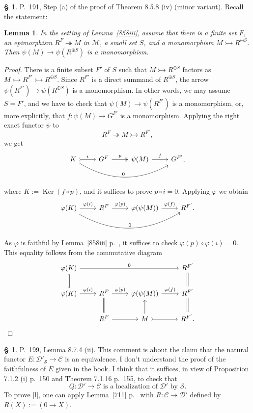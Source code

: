 \documentclass[12pt]{article}%
\newtheorem{lem}[thm]{Lemma}
\theoremstyle{remark}
\theoremstyle{definition}
\newtheorem{s}[thm]{\S}%
\newcommand{\cc}{\mathcal}
\newcommand{\C}{\mathcal C}
\newcommand{\M}{\mathcal M}
\newcommand{\epi}{\twoheadrightarrow}
\DeclareMathOperator{\Ker}{Ker}
\begin{document}
\begin{s} 
P.~191, Step (a) of the proof of Theorem 8.5.8 (iv) (minor variant). Recall the statement: 

\begin{lem}
In the setting of Lemma~\ref{858iii}, assume that there is a finite set $F$, an epimorphism $R^F\epi M$ in $\M$, a small set $S$, and a monomorphism $M\rightarrowtail R^{\oplus S}$. Then $\psi(M)\to\psi(R^{\oplus S})$ is a monomorphism. 
\end{lem}

\begin{proof}
There is a finite subset $F'$ of $S$ such that $M\rightarrowtail R^{\oplus S}$ factors as $M\rightarrowtail R^{F'}\rightarrowtail R^{\oplus S}$. Since $R^{F'}$ is a direct summand of $R^{\oplus S}$, the arrow $\psi(R^{F'})\to\psi(R^{\oplus S})$ is a monomorphism. In other words, we may assume $S=F'$, and we have to check that $\psi(M)\to\psi(R^{F'})$ is a monomorphism, or, more explicitly, that $f:\psi(M)\to G^{F'}$ is a monomorphism. Applying the right exact functor $\psi$ to 
$$
R^F\epi M\rightarrowtail R^{F'},
$$
we get 
$$
\begin{tikzcd}
K\ar[tail]{r}{i}\ar[bend right]{rrr}{0}&G^F\ar[two heads]{r}{p}&\psi(M)\ar{r}{f}&G^{F'},
\end{tikzcd}
$$
where $K:=\Ker(f\circ p)$, and it suffices to prove $p\circ i=0$. Applying $\varphi$ we obtain
$$
\begin{tikzcd}
\varphi(K)\ar{r}{\varphi(i)}\ar[bend right]{rrr}{0}&R^F\ar{r}{\varphi(p)}&\varphi(\psi(M))\ar{r}{\varphi(f)}&R^{F'}.
\end{tikzcd}
$$
As $\varphi$ is faithful by Lemma~\ref{858iii} p.~\pageref{858iii}, it suffices to check $\varphi(p)\circ\varphi(i)=0$. This equality follows from the commutative diagram
$$
\begin{tikzcd}
\varphi(K)\ar[equal]{d}\ar{rrr}{0}&&&R^{F'}\ar[equal]{d}\\
\varphi(K)\ar{r}{\varphi(i)}&R^F\ar[equal]{d}\ar{r}{\varphi(p)}&\varphi(\psi(M))\ar{r}{\varphi(f)}&R^{F'}\ar[equal]{d}\\
&R^F\ar{r}&M\ar[tail]{r}\ar{u}&R^{F'}.
\end{tikzcd}
$$
\end{proof}
\end{s}
%
%
\begin{s}
P.~199, Lemma 8.7.4 (ii). This comment is about the claim that the natural functor $E:\cc D'_{\cc S}\to\C$ is an equivalence. I don't understand the proof of the faithfulness of $E$ given in the book. I think that it suffices, in view of Proposition 7.1.2 (i) p.~150 and Theorem 7.1.16 p.~155, to check that
%
\begin{equation}\label{l}
Q:\cc D'\to\C\text{ is a localization of }\cc D'\text{ by }\cc S.
\end{equation}
%
To prove \eqref{l}, one can apply Lemma~\ref{711} p.~\pageref{711} with $R:\C\to\cc D'$ defined by $R(X):=(0\to X)$.
\end{s}
\end{document}

